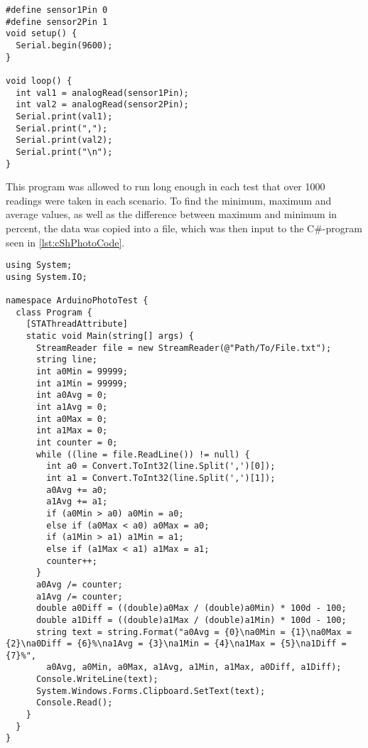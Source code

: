 \lstset{language=C}
\begin{lstlisting}[label = lst:arduinoPhotoCode, caption = Arduino program for photoresistor tests]
#define sensor1Pin 0
#define sensor2Pin 1
void setup() {
  Serial.begin(9600);
}

void loop() {
  int val1 = analogRead(sensor1Pin);
  int val2 = analogRead(sensor2Pin);
  Serial.print(val1);
  Serial.print(",");
  Serial.print(val2);
  Serial.print("\n");
}
\end{lstlisting}

This program was allowed to run long enough in each test that over 1000 readings were taken in each scenario.
To find the minimum, maximum and average values, as well as the difference between maximum and minimum in percent, the data was copied into a file, which was then input to the C\#-program seen in \cref{lst:cShPhotoCode}.

\lstset{language=[Sharp]C}
\begin{lstlisting}[label = lst:cShPhotoCode, caption = C\# data processing code]
using System;
using System.IO;

namespace ArduinoPhotoTest {
  class Program {
    [STAThreadAttribute]
    static void Main(string[] args) {
      StreamReader file = new StreamReader(@"Path/To/File.txt");
      string line;
      int a0Min = 99999;
      int a1Min = 99999;
      int a0Avg = 0;
      int a1Avg = 0;
      int a0Max = 0;
      int a1Max = 0;
      int counter = 0;
      while ((line = file.ReadLine()) != null) {
        int a0 = Convert.ToInt32(line.Split(',')[0]);
        int a1 = Convert.ToInt32(line.Split(',')[1]);
        a0Avg += a0;
        a1Avg += a1;
        if (a0Min > a0) a0Min = a0;
        else if (a0Max < a0) a0Max = a0;
        if (a1Min > a1) a1Min = a1;
        else if (a1Max < a1) a1Max = a1;
        counter++;
      }
      a0Avg /= counter;
      a1Avg /= counter;
      double a0Diff = ((double)a0Max / (double)a0Min) * 100d - 100;
      double a1Diff = ((double)a1Max / (double)a1Min) * 100d - 100;
      string text = string.Format("a0Avg = {0}\na0Min = {1}\na0Max = {2}\na0Diff = {6}%\na1Avg = {3}\na1Min = {4}\na1Max = {5}\na1Diff = {7}%",
        a0Avg, a0Min, a0Max, a1Avg, a1Min, a1Max, a0Diff, a1Diff);
      Console.WriteLine(text);
      System.Windows.Forms.Clipboard.SetText(text);
      Console.Read();
    }
  }
}
\end{lstlisting}
